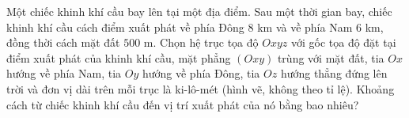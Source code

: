 \begin{ex}
Một chiếc khinh khí cầu bay lên tại một địa điểm. Sau một thời gian bay, chiếc khinh khí cầu cách điểm xuất phát về phía Đông $8$ km và về phía Nam $6$ km, đồng thời cách mặt đất $500$ m. Chọn hệ trục tọa độ $Oxyz$ với gốc tọa độ đặt tại điểm xuất phát của khinh khí cầu, mặt phẳng $(Oxy)$ trùng với mặt đất, tia $Ox$ hướng về phía Nam, tia $Oy$ hướng về phía Đông, tia $Oz$ hướng thẳng đứng lên trời và đơn vị dài trên mỗi trục là ki-lô-mét (hình vẽ, không theo tỉ lệ). Khoảng cách từ chiếc khinh khí cầu đến vị trí xuất phát của nó bằng bao nhiêu?
\begin{center}
\end{center}
\end{ex}
